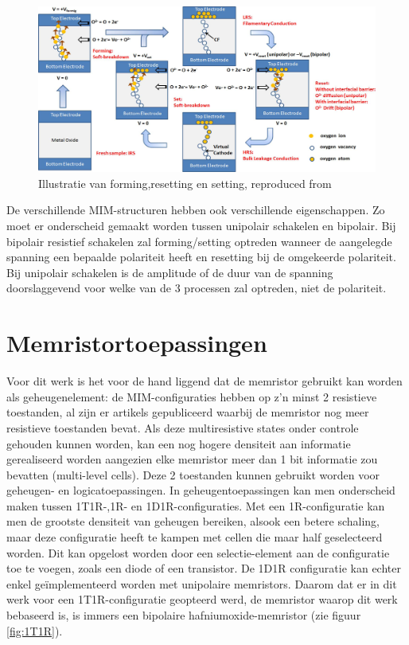 \begin{figure}
  \centering
  \includegraphics[scale=0.22]{../fig/hfdstk-cel-forming-reset-set.png}
  \caption[Forming,resetting en setting van een memristor]{Illustratie van forming,resetting en setting, reproduced from\cite{Won12}}
  \label{fig:forming-reset-set}
\end{figure}

De verschillende MIM-structuren hebben ook verschillende eigenschappen. Zo moet er onderscheid gemaakt worden tussen unipolair schakelen en bipolair. Bij bipolair resistief schakelen zal forming/setting optreden wanneer de aangelegde spanning een bepaalde polariteit heeft en resetting bij de omgekeerde polariteit. Bij unipolair schakelen is de amplitude of de duur van de spanning doorslaggevend voor welke van de 3 processen zal optreden, niet de polariteit. 


\section{Memristortoepassingen}
\label{1T1R}

Voor dit werk is het voor de hand liggend dat de memristor gebruikt kan worden als geheugenelement: de MIM-configuraties hebben op z'n minst 2 resistieve toestanden, al zijn er artikels gepubliceerd waarbij de memristor nog meer resistieve toestanden bevat\cite{Liu12}. Als deze multiresistive states onder controle gehouden kunnen worden, kan een nog hogere densiteit aan informatie gerealiseerd worden aangezien elke memristor meer dan 1 bit informatie zou bevatten (multi-level cells).
Deze 2 toestanden kunnen gebruikt worden voor geheugen- en logicatoepassingen\cite{ros12}\cite{raj09}. In geheugentoepassingen kan men onderscheid maken tussen 1T1R-,1R- en 1D1R-configuraties\cite{Den13}. Met een 1R-configuratie kan men de grootste densiteit van geheugen bereiken, alsook een betere schaling, maar deze configuratie heeft te kampen met cellen die maar half geselecteerd worden. Dit kan opgelost worden door een selectie-element aan de configuratie toe te voegen, zoals een diode of een transistor. De 1D1R configuratie kan echter enkel geïmplementeerd worden met unipolaire memristors\cite{Wou09}. Daarom dat er in dit werk voor een 1T1R-configuratie geopteerd werd, de memristor waarop dit werk bebaseerd is, is immers een bipolaire hafniumoxide-memristor (zie figuur \ref{fig:1T1R}).

